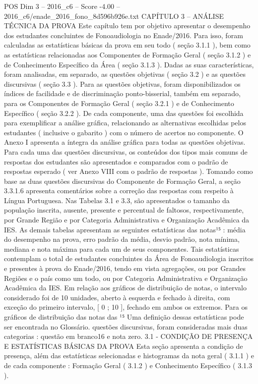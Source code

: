 \begin{textsample}{POS Dim 3 – 2016\_c6 – Score -4.00 – 2016\_c6/enade\_2016\_fono\_8d596b926e.txt}  \label{ex:f3_pos_250}
CAPÍTULO 3 – ANÁLISE TÉCNICA DA PROVA Este capítulo tem por objetivo apresentar o desempenho dos estudantes concluintes de Fonoaudiologia no Enade/2016.
Para isso, foram calculadas as estatísticas básicas da prova em seu todo ( seção 3.1.1 ), bem como as estatísticas relacionadas aos Componentes de Formação Geral ( seção 3.1.2 ) e de Conhecimento Específico da Área ( seção 3.1.3 ).
Dadas as suas características, foram analisadas, em separado, as questões objetivas ( seção 3.2 ) e as questões discursivas ( seção 3.3 ).
Para as questões objetivas, foram disponibilizados os índices de facilidade e de discriminação ponto-bisserial, também em separado, para os Componentes de Formação Geral ( seção 3.2.1 ) e de Conhecimento Específico ( seção 3.2.2 ).
De cada componente, uma das questões foi escolhida para exemplificar a análise gráfica, relacionando as alternativas escolhidas pelos estudantes ( inclusive o gabarito ) com o número de acertos no componente.
O Anexo I apresenta a íntegra da análise gráfica para todas as questões objetivas.
Para cada uma das questões discursivas, os conteúdos dos tipos mais comuns de respostas dos estudantes são apresentados e comparados com o padrão de respostas esperado ( ver Anexo VIII com o padrão de respostas ).
Tomando como base as duas questões discursivas do Componente de Formação Geral, a seção 3.3.1.6 apresenta comentários sobre a correção das respostas com respeito à Língua Portuguesa.
Nas Tabelas 3.1 e 3.3, são apresentados o tamanho da população inscrita, ausente, presente e percentual de faltosos, respectivamente, por Grande Região e por Categoria Administrativa e Organização Acadêmica da IES.
As demais tabelas apresentam as seguintes estatísticas das notas¹⁵ : média do desempenho na prova, erro padrão da média, desvio padrão, nota mínima, mediana e nota máxima para cada um de seus componentes.
Tais estatísticas contemplam o total de estudantes concluintes da Área de Fonoaudiologia inscritos e presentes à prova do Enade/2016, tendo em vista agregações, ou por Grandes Regiões e o país como um todo, ou por Categoria Administrativa e Organização Acadêmica da IES.
Em relação aos gráficos de distribuição de notas, o intervalo considerado foi de 10 unidades, aberto à esquerda e fechado à direita, com exceção do primeiro intervalo, [ 0 ; 10 ], fechado em ambos os extremos.
Para os gráficos de distribuição das notas das ¹⁵ Uma definição dessas estatísticas pode ser encontrada no Glossário. questões discursivas, foram consideradas mais duas categorias : questão em branco16 e nota zero. 3.1 - CONDIÇÃO DE PRESENÇA E ESTATÍSTICAS BÁSICAS DA PROVA Esta seção apresenta a condição de presença, além das estatísticas selecionadas e histogramas da nota geral ( 3.1.1 ) e de cada componente : Formação Geral ( 3.1.2 ) e Conhecimento Específico ( 3.1.3 ).

\end{textsample}
